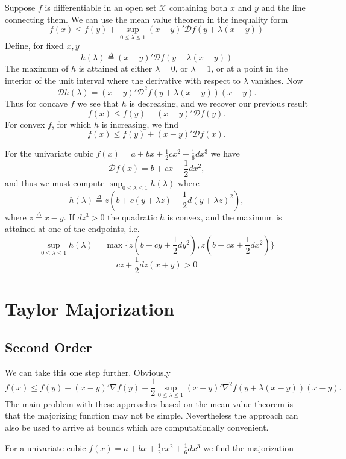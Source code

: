 \documentclass[
  12pt,
]{book}
\begin{document}
Suppose \(f\) is differentiable in an open set \(\mathcal{X}\) containing both \(x\) and \(y\) and the line connecting them. We can use the mean value theorem
in the inequality form
\[
f(x)\leq f(y)+\sup_{0\leq\lambda\leq 1}
(x-y)'\mathcal{D}f(y+\lambda(x-y))
\]
Define, for fixed \(x,y\)
\[
h(\lambda)\mathop{=}\limits^{\Delta}(x-y)'\mathcal{D}f(y+\lambda(x-y))
\]
The maximum of \(h\) is attained at either \(\lambda=0\), or \(\lambda=1\), or at
a point in the interior of the unit interval where the derivative with respect to \(\lambda\) vanishes. Now
\[
\mathcal{D}h(\lambda)=(x-y)'\mathcal{D}^2f(y+\lambda(x-y))(x-y).
\]
Thus for concave \(f\) we see that \(h\) is decreasing, and we recover our previous result
\[
f(x)\leq f(y)+(x-y)'\mathcal{D}f(y).
\]
For convex \(f\), for which \(h\) is increasing, we find
\[
f(x)\leq f(y)+(x-y)'\mathcal{D}f(x).
\]

For the univariate cubic \(f(x)=a+bx+\frac12 cx^2+\frac16 dx^3\) we have
\[
\mathcal{D}f(x)=b+cx+\frac12 dx^2,
\]
and thus we must
compute \(\sup_{0\leq\lambda\leq 1}h(\lambda)\)
where
\[
h(\lambda)\mathop{=}\limits^{\Delta}z(b+c(y+\lambda z)+\frac12d(y+\lambda z)^2),
\]
where \(z\mathop{=}\limits^{\Delta}x-y\). If \(dz^3 > 0\) the quadratic \(h\) is convex, and the maximum is attained at one of the endpoints, i.e.
\[
\sup_{0\leq\lambda\leq 1}h(\lambda)=
\max\{z(b+cy+\frac12 dy^2),z(b+cx+\frac12 dx^2)\}
\]
\[
cz+\frac12 dz(x+y)>0
\]

\hypertarget{taylor-majorization}{%
\section{Taylor Majorization}\label{taylor-majorization}}

\hypertarget{second-order}{%
\subsection{Second Order}\label{second-order}}

We can take this one step further. Obviously
\[
f(x)\leq f(y)+(x-y)'\nabla f(y)+
\frac{1}{2}\sup_{0\leq\lambda\leq 1}
(x-y)'\nabla^2f(y+\lambda(x-y))
(x-y).
\]
The main problem with these approaches based on the mean value theorem is that
the majorizing function may not be simple. Nevertheless the approach can also be used to arrive at bounds
which are computationally convenient.

For a univariate cubic \(f(x)=a+bx+\frac12 cx^2+\frac16 dx^3\) we find the majorization
\end{document}
